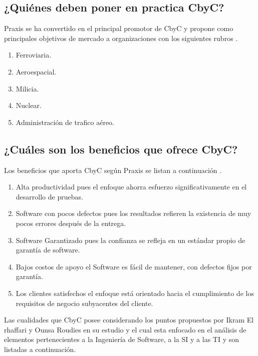 \documentclass[runningheads,a4paper]{llncs}
\begin{document}
\subsection{¿Quiénes deben poner en practica \gls{CbyC}?}
\gls{Praxis} se ha convertido en el principal promotor de \gls{CbyC} y propone como principales objetivos de mercado a organizaciones con los siguientes rubros \cite{CbyCPraxis}.

\begin{enumerate}
	\item Ferroviaria. 
	\item Aeroespacial.
	\item Milicia.
	\item Nuclear.
	\item Administración de trafico aéreo.
\end{enumerate}


\subsection{¿Cuáles son los beneficios que ofrece \gls{CbyC}?}
Los beneficios que aporta \gls{CbyC} según \gls{Praxis} se listan a continuación \cite{CbyCHighIntegritySystems}.

\begin{enumerate}
	\item Alta productividad pues el enfoque ahorra esfuerzo significativamente en el desarrollo de pruebas.
	\item \gls{Software} con pocos defectos pues los resultados refieren la existencia de muy pocos errores después de la entrega.
	\item \gls{Software} Garantizado pues la confianza se refleja en un estándar propio de garantía de software.
	\item Bajos costos de apoyo el \gls{Software} es fácil de mantener, con defectos fijos por garantía.
	\item Los clientes satisfechos el enfoque está orientado hacia el cumplimiento de los requisitos de negocio subyacentes del cliente.
\end{enumerate}

Las cualidades que \gls{CbyC} posee considerando los puntos propuestos por Ikram El rhaffari y Ounsa Roudies en su estudio y el cual esta enfocado en el análisis de elementos pertenecientes a la Ingeniería de \gls{Software}, a la \gls{SI} y a las \gls{TI} y son listadas a continuación.  
\end{document}
